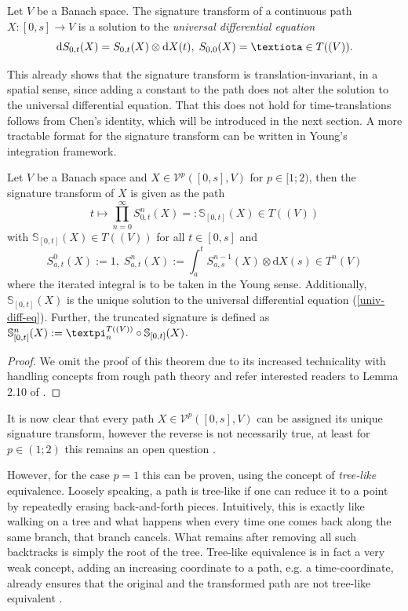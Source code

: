 \documentclass[openany]{book}
\begin{document}
\begin{definition}
    Let $V$ be a Banach space. The signature transform of a continuous path $X:[0,s]\to V$ is a solution to the \textit{universal differential equation} \cite{lyons2022}
    \begin{equation}\label{univ-diff-eq}
        \mathrm d S_{0,t}(X)=S_{0,t}(X)\otimes \mathrm dX(t),\;S_{0,0}(X)=\giota\in T((V)).
    \end{equation}
\end{definition}
This already shows that the signature transform is translation-invariant, in a spatial sense, since adding a constant to the path does not alter the solution to the universal differential equation. That this does not hold for time-translations follows from Chen's identity, which will be introduced in the next section. A more tractable format for the signature transform can be written in Young's integration framework.
\begin{theorem}
    Let $V$ be a Banach space and $X\in \mathscr V^p([0,s], V)$ for $p\in [1;2)$, then the signature transform of $X$ is given as the path
    \begin{equation*}
        t\mapsto \prod_{n=0}^\infty S^{n}_{0,t}(X)=:\mathbb S_{[0,t]}(X)\in T((V))
    \end{equation*}
    with $\mathbb S_{[0,t]}(X)\in T((V))$ for all $t\in [0,s]$ and
    \begin{equation*}
        S_{a,t}^0(X):=1,\;S_{a,t}^n(X):=\int_a^t S^{n-1}_{a,s}(X)\otimes \mathrm dX(s)\in T^{n}(V)
    \end{equation*}
    where the iterated integral is to be taken in the Young sense. Additionally, $\mathbb S_{[0,t]}(X)$ is the unique solution to the universal differential equation (\ref{univ-diff-eq}). Further, the truncated signature is defined as $\mathbb S_{[0,t]}^n(X):=\gpi_n^{T((V))}\circ \mathbb S_{[0,t]}(X)$.
    \begin{proof}
        We omit the proof of this theorem due to its increased technicality with handling concepts from rough path theory and refer interested readers to Lemma 2.10 of \cite{lyons2007}.
    \end{proof}
\end{theorem}
It is now clear that every path $X\in \mathscr V^p([0,s], V)$ can be assigned its unique signature transform, however the reverse is not necessarily true, at least for $p\in (1;2)$ this remains an open question \cite{lyons2007}. 
\par However, for the case $p=1$ this can be proven, using the concept of \textit{tree-like} equivalence. Loosely speaking, a path is tree-like if one can reduce it to a point by repeatedly erasing back-and-forth pieces. Intuitively, this is exactly like walking on a tree and what happens when every time one comes back along the same branch, that branch cancels. What remains after removing all such backtracks is simply the root of the tree. Tree-like equivalence is in fact a very weak concept, adding an increasing coordinate to a path, e.g. a time-coordinate, already ensures that the original and the transformed path are not tree-like equivalent \cite{kiraly2019}.
\end{document}
